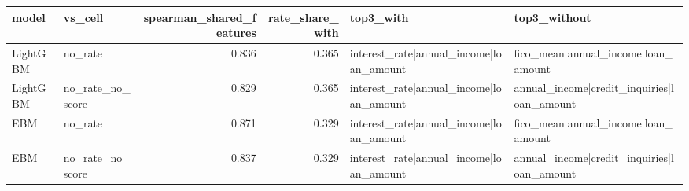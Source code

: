 \begin{tabular}{llrrll}
\toprule
model & vs\_cell & spearman\_shared\_features & rate\_share\_with & top3\_with & top3\_without \\
\midrule
LightGBM & no\_rate & 0.836 & 0.365 & interest\_rate|annual\_income|loan\_amount & fico\_mean|annual\_income|loan\_amount \\
LightGBM & no\_rate\_no\_score & 0.829 & 0.365 & interest\_rate|annual\_income|loan\_amount & annual\_income|credit\_inquiries|loan\_amount \\
EBM & no\_rate & 0.871 & 0.329 & interest\_rate|annual\_income|loan\_amount & fico\_mean|annual\_income|loan\_amount \\
EBM & no\_rate\_no\_score & 0.837 & 0.329 & interest\_rate|annual\_income|loan\_amount & annual\_income|credit\_inquiries|loan\_amount \\
\bottomrule
\end{tabular}
